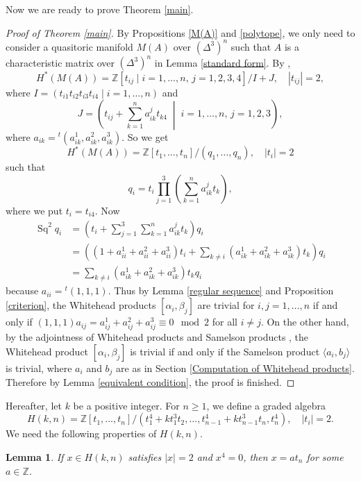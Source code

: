 \documentclass[a4paper]{amsart}
\numberwithin{equation}{section}
\newtheorem{lemma}[theorem]{Lemma}
\theoremstyle{definition}
\theoremstyle{remark}
\numberwithin{equation}{section}
\newcommand{\Z}{\mathbb{Z}}
\newcommand{\Sq}{\operatorname{Sq}}
\begin{document}
Now we are ready to prove Theorem \ref{main}.



\begin{proof}
  [Proof of Theorem \ref{main}]
  By Propositions \ref{M(A)} and \ref{polytope}, we only need to consider a quasitoric manifold $M(A)$ over $(\Delta^3)^n$ such that $A$ is a characteristic matrix over $(\Delta^3)^n$ in Lemma \ref{standard form}. By \cite[Theorem 4.14]{DJ},
  \[
    H^*(M(A))=\Z[t_{ij}\mid i=1,\ldots,n,\,j=1,2,3,4]/I+J,\quad|t_{ij}|=2,
  \]
  where $I=(t_{i1}t_{i2}t_{i3}t_{i4}\mid i=1,\ldots,n)$ and
  \[
    J=\left(t_{ij}+\sum_{k=1}^na_{ik}^jt_{k4}\;\middle|\;i=1,\ldots,n,\,j=1,2,3\right),
  \]
  where $a_{ik}={}^t(a_{ik}^1,a_{ik}^2,a_{ik}^3)$. So we get
  \begin{equation}
    \label{H(M(A))}
    H^*(M(A))=\Z[t_1,\ldots,t_n]/(q_1,\ldots,q_n),\quad|t_i|=2
  \end{equation}
  such that
  \[
    q_i=t_i\prod_{j=1}^3\left(\sum_{k=1}^na_{ik}^jt_k\right),
  \]
  where we put $t_i=t_{i4}$. Now
  \begin{align*}
    \Sq^2q_i&=\left(t_i+\sum_{j=1}^3\sum_{k=1}^na_{ik}^jt_k\right)q_i\\
    &=((1+a_{ii}^1+a_{ii}^2+a_{ii}^3)t_i+\sum_{k\ne i}(a_{ik}^1+a_{ik}^2+a_{ik}^3)t_k)q_i\\
    &=\sum_{k\ne i}(a_{ik}^1+a_{ik}^2+a_{ik}^3)t_kq_i
  \end{align*}
  because $a_{ii}={}^t(1,1,1)$. Thus by Lemma \ref{regular sequence} and Proposition \ref{criterion}, the Whitehead products $[\alpha_i,\beta_j]$ are trivial for $i,j=1,\ldots,n$ if and only if $(1,1,1)a_{ij}=a_{ij}^1+a_{ij}^2+a_{ij}^3\equiv 0\mod 2$ for all $i\ne j$. On the other hand, by the adjointness of Whitehead products and Samelson products \cite{S}, the Whitehead product $[\alpha_i,\beta_j]$ is trivial if and only if the Samelson product $\langle a_i,b_j\rangle$ is trivial, where $a_i$ and $b_j$ are as in Section \ref{Computation of Whitehead products}. Therefore by Lemma \ref{equivalent condition}, the proof is finished.
\end{proof}


Hereafter, let $k$ be a positive integer. For $n\ge 1$, we define a graded algebra
\[
  H(k,n)=\Z[t_1,\ldots,t_n]/(t_1^4+kt_1^3t_2,\ldots,t_{n-1}^4+kt_{n-1}^3t_n,t_n^4),\quad|t_i|=2.
\]
We need the following properties of $H(k,n)$.



\begin{lemma}
  \label{x^4}
  If $x\in H(k,n)$ satisfies $|x|=2$ and $x^4=0$, then $x=at_n$ for some $a\in\Z$.
\end{lemma}
\end{document}
